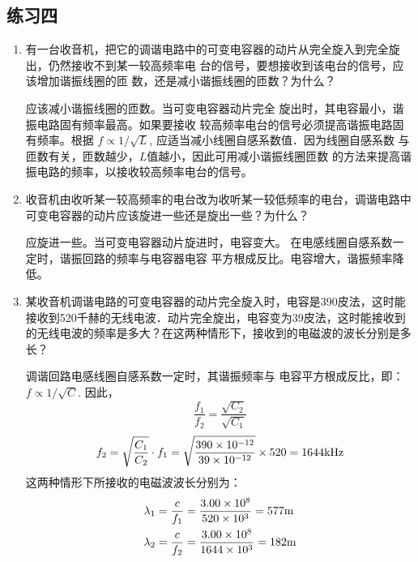 \subsection{练习四}
\begin{enumerate}
	\item 有一台收音机，把它的调谐电路中的可变电容器的动片从完全旋入到完全旋出，仍然接收不到某一较高频率电
	台的信号，要想接收到该电台的信号，应该增加谐振线圈的匝
	数，还是减小谐振线圈的匝数？为什么？

    \begin{solution}
应该减小谐振线圈的匝数。当可变电容器动片完全
旋出时，其电容最小，谐振电路固有频率最高。如果要接收
较高频率电台的信号必须提高谐振电路固有频率。根据
$f\propto 1/\sqrt{L}$, 应适当减小线圈自感系数值．因为线圈自感系数
与匝数有关，匝数越少，$L$值越小，因此可用减小谐振线圈匝数
的方法来提高谐振电路的频率，以接收较高频率电台的信号。
    \end{solution}
    
	\item 收音机由收听某一较高频率的电台改为收听某一较低频率的电台，调谐电路中可变电容器的动片应该旋进一些还是旋出一些？为什么？

    \begin{solution}
    应旋进一些。当可变电容器动片旋进时，电容变大。
在电感线圈自感系数一定时，谐振回路的频率与电容器电容
平方根成反比。电容增大，谐振频率降低。
    \end{solution}
    
	\item 某收音机调谐电路的可变电容器的动片完全旋入时，电容是390皮法，这时能接收到520千赫的无线电波．动片完全旋出，电容变为39皮法，这时能接收到的无线电波的频率是多大？在这两种情形下，接收到的电磁波的波长分别是多长？

    \begin{solution}
调谐回路电感线圈自感系数一定时，其谐振频率与
电容平方根成反比，即：$f\propto 1/\sqrt{C}$. 因此，
\[\frac{f_1}{f_2}=\frac{\sqrt{C_2}}{\sqrt{C_1}}\]
\[f_2=\sqrt{\frac{C_1}{C_2}}\cdot f_1=\sqrt{\frac{390\times 10^{-12}}{39\times 10^{-12}}}\times 520=1644{\rm kHz}\]
这两种情形下所接收的电磁波波长分别为：
\[\begin{split}
\lambda_1&=\frac{c}{f_1}=\frac{3.00\times 10^8}{520\times 10^3}=577{\rm m}\\
\lambda_2&=\frac{c}{f_2}=\frac{3.00\times 10^8}{1644\times 10^3}=182{\rm m}\\
\end{split}\]
    \end{solution}    
\end{enumerate}


